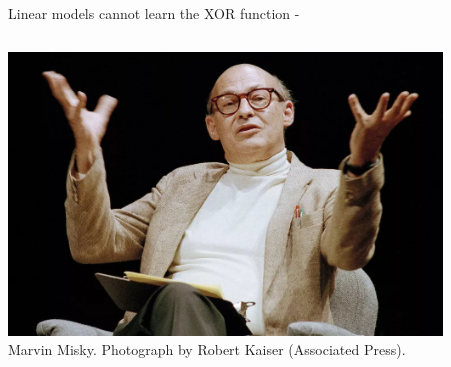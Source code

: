 \begin{frame}[t,allowframebreaks]{Linear models cannot learn the XOR function -} 

    \begin{columns}[t]
        \begin{column}{0.50\textwidth}
            \begin{center}
                \includegraphics[width=0.90\textwidth]
                    {./images/people/minsky_1.png}\\
                {\scriptsize 
                Marvin Misky. 
                \color{col:attribution} 
                Photograph by Robert Kaiser (Associated Press).\\}        
            \end{center}
        \end{column}
        \begin{column}{0.50\textwidth}
        \end{column}
    \end{columns}


\end{frame}
